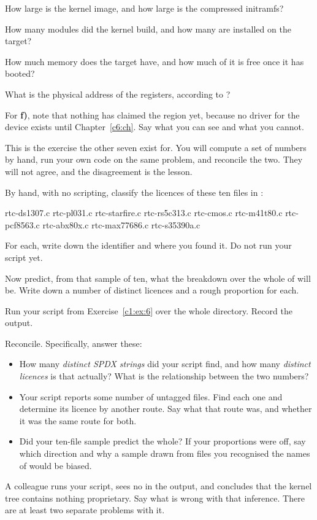  How large is the kernel image, and how large is the compressed initramfs?

 How many modules did the kernel build, and how many are installed on the target?

 How much memory does the target have, and how much of it is free once it has booted?

 What is the physical address of the  registers, according to
?

For \textbf{f)}, note that nothing has claimed the region yet, because no driver for the device
exists until Chapter~\ref{c6:ch}. Say what you can see and what you cannot.

\label{c1:ex:8}

This is the exercise the other seven exist for. You will compute a set of numbers by hand, run your
own code on the same problem, and reconcile the two. They will not agree, and the disagreement is
the lesson.

 By hand, with no scripting, classify the licences of these ten files in
:

\begin{console}
rtc-ds1307.c   rtc-pl031.c    rtc-starfire.c   rtc-rs5c313.c   rtc-cmos.c
rtc-m41t80.c   rtc-pcf8563.c  rtc-abx80x.c     rtc-max77686.c  rtc-s35390a.c
\end{console}

\noindent For each, write down the identifier and where you found it. Do not run your script yet.

 Now predict, from that sample of ten, what the breakdown over the whole of
 will be. Write down a number of distinct licences and a rough proportion for
each.

 Run your script from Exercise~\ref{c1:ex:6} over the whole directory. Record the output.

 Reconcile. Specifically, answer these:
\begin{itemize}
  \item How many \emph{distinct SPDX strings} did your script find, and how many \emph{distinct
    licences} is that actually? What is the relationship between the two numbers?
  \item Your script reports some number of untagged files. Find each one and determine its licence
    by another route. Say what that route was, and whether it was the same route for both.
  \item Did your ten-file sample predict the whole? If your proportions were off, say which
    direction and why a sample drawn from files you recognised the names of would be biased.
\end{itemize}

 A colleague runs your script, sees no  in the output, and concludes that
the kernel tree contains nothing proprietary. Say what is wrong with that inference. There are at
least two separate problems with it.
